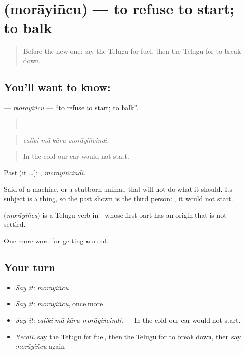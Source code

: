 \section[\texorpdfstring{\te{మొరాయించు} (morāyiñcu)}{మొరాయించు (morāyiñcu)}]{ (morāyiñcu) — to refuse to start; to balk}

\label{lesson:TE-C444-morayincu}



\begin{quote}
Before the new one: say the Telugu for fuel, then the Telugu for to break down.
\end{quote}

\subsection*{You'll want to know: }
\textbf{} — \emph{morāyiñcu} — \textquotedblleft{}to refuse to start; to balk\textquotedblright{}.

\begin{quote}
   .
\end{quote}

\begin{quote}
\emph{caliki mā kāru morāyiñcindi.}
\end{quote}

\begin{quote}
In the cold our car would not start.
\end{quote}

Past (it …): , \emph{morāyiñcindi}.

Said of a machine, or a stubborn animal, that will not do what it should. Its subject is a thing, so the past shown is the third person: , it would not start.

\begin{cousinweb}
\textbf{} (\emph{morāyiñcu}) is a Telugu verb in - whose first part has an origin that is not settled.
\end{cousinweb}

\begin{grammarlens}[title={What you've built}]
One more word for getting around.
\end{grammarlens}

\subsection*{Your turn}
\begin{itemize}
\raggedright
  \item \emph{Say it:} \emph{morāyiñcu}
  \item \emph{Say it:} \emph{morāyiñcu}, once more
  \item \emph{Say it:} \emph{caliki mā kāru morāyiñcindi.} — In the cold our car would not start.
  \item \emph{Recall:} say the Telugu for fuel, then the Telugu for to break down, then say \emph{morāyiñcu} again
\end{itemize}

